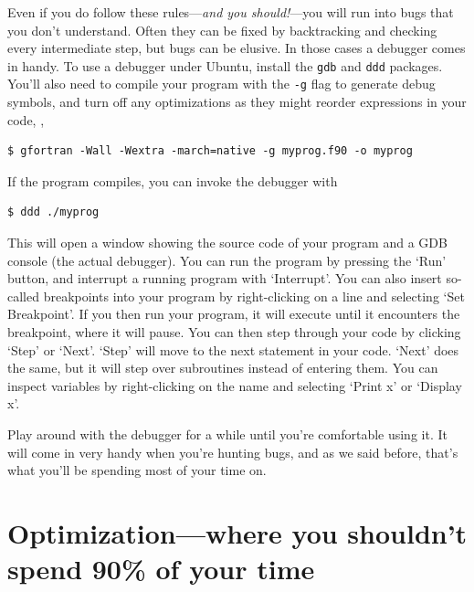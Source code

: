 \documentclass[openany,oneside]{report}
\begin{document}
Even if you do follow these rules---\emph{and you should!}---you will run into bugs that you don't understand.
Often they can be fixed by backtracking and checking every intermediate step, but bugs can be elusive.
In those cases a debugger comes in handy.
To use a debugger under Ubuntu, install the \texttt{gdb} and \texttt{ddd} packages.
You'll also need to compile your program with the \texttt{-g} flag to generate debug symbols, and turn off any optimizations as they might reorder expressions in your code, \eg,
\begin{verbatim}
$ gfortran -Wall -Wextra -march=native -g myprog.f90 -o myprog
\end{verbatim}
If the program compiles, you can invoke the debugger with
\begin{verbatim}
$ ddd ./myprog
\end{verbatim}
This will open a window showing the source code of your program and a GDB console (the actual debugger).
You can run the program by pressing the `Run' button, and interrupt a running program with `Interrupt'.
You can also insert so-called breakpoints into your program by right-clicking on a line and selecting `Set Breakpoint'.
If you then run your program, it will execute until it encounters the breakpoint, where it will pause.
You can then step through your code by clicking `Step' or `Next'.
`Step' will move to the next statement in your code.
`Next' does the same, but it will step over subroutines instead of entering them.
You can inspect variables by right-clicking on the name and selecting `Print x' or `Display x'.

Play around with the debugger for a while until you're comfortable using it.
It will come in very handy when you're hunting bugs, and as we said before, that's what you'll be spending most of your time on.

\chapter[Optimization]{Optimization---where you shouldn't spend 90\% of your time}
\label{chap:Optimization}
\end{document}
